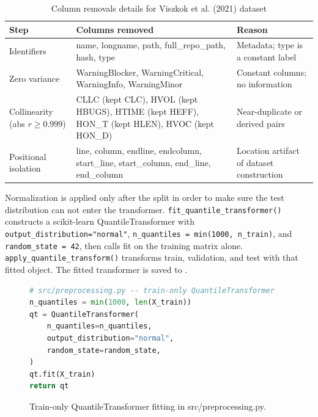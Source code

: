 \begin{table}[H]
  \centering
  \caption{Column removals details for Viszkok et al. (2021) dataset}
  \label{tab:removals-viszkok}
  \begin{tabularx}{\textwidth}{|>{\raggedright\arraybackslash}p{2.8cm}|>{\raggedright\arraybackslash}X|>{\raggedright\arraybackslash}X|}
    \hline
    \textbf{Step} & \textbf{Columns removed} & \textbf{Reason} \\
    \hline
    Identifiers & name, longname, path, full\_repo\_path, hash, type & Metadata; type is a constant label \\
    \hline
    Zero variance & WarningBlocker, WarningCritical, WarningInfo, WarningMinor & Constant columns; no information \\
    \hline
    Collinearity (abs $r \ge 0.999$) & CLLC (kept CLC), HVOL (kept HBUGS), HTIME (kept HEFF), HON\_T (kept HLEN), HVOC (kept HON\_D) & Near-duplicate or derived pairs \\
    \hline
    Positional isolation & line, column, endline, endcolumn, start\_line, start\_column, end\_line, end\_column & Location artifact of dataset construction \\
    \hline
  \end{tabularx}
\end{table}

Normalization is applied only after the split in order to make sure the test distribution can not enter the transformer. \texttt{fit\_quantile\_transformer()} constructs a scikit-learn QuantileTransformer with \texttt{output\_distribution="normal"}, \texttt{n\_quantiles = min(1000, n\_train)}, and \texttt{random\_state = 42}, then calls fit on the training matrix alone. \texttt{apply\_quantile\_transform()} transforms train, validation, and test with that fitted object. The fitted transformer is saved to .

\begin{figure}[H]
  \centering
\begin{lstlisting}[language=python]
# src/preprocessing.py -- train-only QuantileTransformer
n_quantiles = min(1000, len(X_train))
qt = QuantileTransformer(
    n_quantiles=n_quantiles,
    output_distribution="normal",
    random_state=random_state,
)
qt.fit(X_train)
return qt
\end{lstlisting}
  \caption{Train-only QuantileTransformer fitting in src/preprocessing.py.}
  \label{fig:train-only-qt}
\end{figure}

